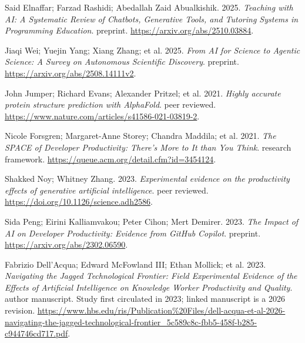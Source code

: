{\begin{description}[leftmargin=2em,labelwidth=1.5em,itemsep=1pt,parsep=0pt]
\item[8.] \hypertarget{ref-ref-e71e370e4c}{} Said Elnaffar; Farzad Rashidi; Abedallah Zaid Abualkishik. 2025. \textit{Teaching with AI: A Systematic Review of Chatbots, Generative Tools, and Tutoring Systems in Programming Education}. preprint. \url{https://arxiv.org/abs/2510.03884}.

\item[9.] \hypertarget{ref-agenticsurvey2025}{} Jiaqi Wei; Yuejin Yang; Xiang Zhang; et al. 2025. \textit{From AI for Science to Agentic Science: A Survey on Autonomous Scientific Discovery}. preprint. \url{https://arxiv.org/abs/2508.14111v2}.

\item[10.] \hypertarget{ref-alphafold2021}{} John Jumper; Richard Evans; Alexander Pritzel; et al. 2021. \textit{Highly accurate protein structure prediction with AlphaFold}. peer reviewed. \url{https://www.nature.com/articles/s41586-021-03819-2}.

\item[11.] \hypertarget{ref-space2021}{} Nicole Forsgren; Margaret-Anne Storey; Chandra Maddila; et al. 2021. \textit{The SPACE of Developer Productivity: There's More to It than You Think}. research framework. \url{https://queue.acm.org/detail.cfm?id=3454124}.

\item[12.] \hypertarget{ref-noy2023}{} Shakked Noy; Whitney Zhang. 2023. \textit{Experimental evidence on the productivity effects of generative artificial intelligence}. peer reviewed. \url{https://doi.org/10.1126/science.adh2586}.

\item[13.] \hypertarget{ref-peng2023}{} Sida Peng; Eirini Kalliamvakou; Peter Cihon; Mert Demirer. 2023. \textit{The Impact of AI on Developer Productivity: Evidence from GitHub Copilot}. preprint. \url{https://arxiv.org/abs/2302.06590}.

\item[14.] \hypertarget{ref-dellacqua2023}{} Fabrizio Dell'Acqua; Edward McFowland III; Ethan Mollick; et al. 2023. \textit{Navigating the Jagged Technological Frontier: Field Experimental Evidence of the Effects of Artificial Intelligence on Knowledge Worker Productivity and Quality}. author manuscript. Study first circulated in 2023; linked manuscript is a 2026 revision. \url{https://www.hbs.edu/ris/Publication\%20Files/dell-acqua-et-al-2026-navigating-the-jagged-technological-frontier\_5c589c8c-fbb5-458f-b285-c944746cd717.pdf}.


\end{description}}

